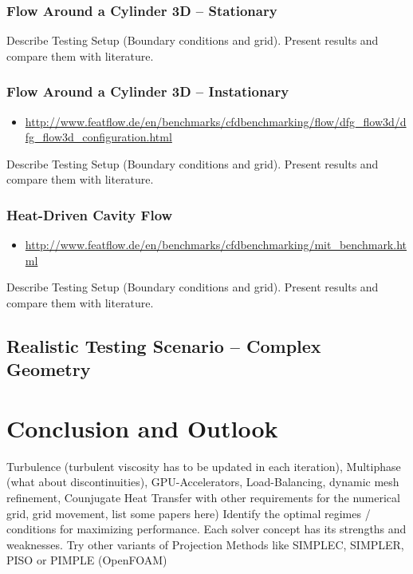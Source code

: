 \documentclass[article,type=msc,colorback,accentcolor=tud2a]{tudthesis}
\begin{document}
      \subsubsection{Flow Around a Cylinder 3D -- Stationary}
        Describe Testing Setup (Boundary conditions and grid). Present results and compare them with literature.
      \subsubsection{Flow Around a Cylinder 3D -- Instationary}
        \begin{itemize}
          \item\url{http://www.featflow.de/en/benchmarks/cfdbenchmarking/flow/dfg_flow3d/dfg_flow3d_configuration.html}
        \end{itemize}
        Describe Testing Setup (Boundary conditions and grid). Present results and compare them with literature.

      \subsubsection{Heat-Driven Cavity Flow}
        \begin{itemize}
          \item \url{http://www.featflow.de/en/benchmarks/cfdbenchmarking/mit_benchmark.html}
        \end{itemize}
        Describe Testing Setup (Boundary conditions and grid). Present results and compare them with literature.
    \subsection{Realistic Testing Scenario -- Complex Geometry}
        
  \section{Conclusion and Outlook}
  Turbulence (turbulent viscosity has to be updated in each iteration), Multiphase (what about discontinuities), GPU-Accelerators, Load-Balancing, dynamic mesh refinement, Counjugate Heat Transfer with other requirements for the numerical grid, grid movement, list some papers here)
    Identify the optimal regimes / conditions for maximizing performance. Each solver concept has its strengths and weaknesses.
    Try other variants of Projection Methods like SIMPLEC, SIMPLER, PISO or PIMPLE (OpenFOAM)

    \nocite{*}

\clearpage
{}
{}

\end{document}
